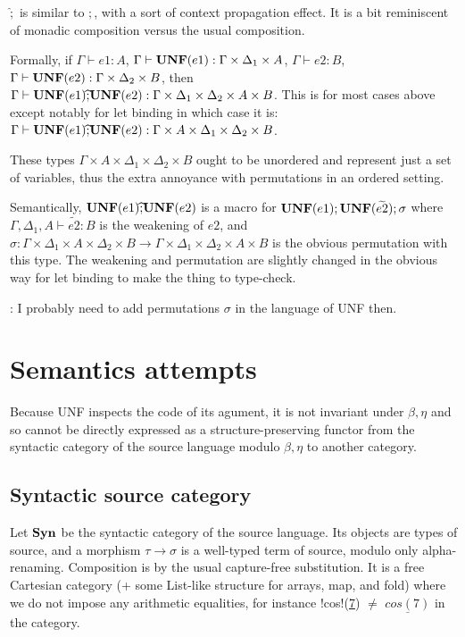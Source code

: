 $\widehat{;}$ is similar to $;$, with a sort of context propagation effect. 
It is a bit reminiscent of monadic composition versus the usual composition.

Formally, if $\Gamma\vdash e1: A$, $\Gamma\vdash \mathbf{UNF}(e1): \Gamma\times\Delta_1\times A$, $\Gamma\vdash e2: B$, $\Gamma\vdash \mathbf{UNF}(e2): \Gamma\times\Delta_2\times B$, then $\Gamma\vdash \mathbf{UNF}(e1) \widehat{;} \mathbf{UNF}(e2): \Gamma\times \Delta_1\times \Delta_2 \times A \times B$.
This is for most cases above except notably for let binding in which case it is: 
 $\Gamma\vdash \mathbf{UNF}(e1) \widehat{;} \mathbf{UNF}(e2): \Gamma\times A \times \Delta_1\times \Delta_2 \times B$. 

 These types $\Gamma\times A \times \Delta_1\times \Delta_2 \times B$ ought to be unordered and represent just a set of variables, thus the extra annoyance with permutations in an ordered setting. 

 Semantically, $\mathbf{UNF}(e1) \widehat{;} \mathbf{UNF}(e2)$ is a macro for $\mathbf{UNF}(e1) ; \mathbf{UNF}(\widetilde{e2}); \sigma$ where $\Gamma,\Delta_1,A\vdash \widetilde{e2}:B$ is the weakening of $e2$, and $\sigma: \Gamma\times\Delta_1\times A \times \Delta_2 \times B \to \Gamma\times\Delta_1\times \Delta_2 \times A\times B$ is the obvious permutation with this type.
The weakening and permutation are slightly changed in the obvious way for let binding to make the thing to type-check. 


 : I probably need to add permutations $\sigma$ in the language of UNF then.


\section{Semantics attempts}

Because UNF inspects the code of its agument, it is not invariant under $\beta,\eta$ and so cannot be directly expressed as a structure-preserving functor from the syntactic category of the source language modulo $\beta,\eta$ to another category. 

\subsection{Syntactic source category}

Let $\mathbf{Syn}$ be the syntactic category of the source language. Its objects are types of source, and a morphism $\tau \to \sigma$ is a well-typed term of source, modulo only alpha-renaming. Composition is by the usual capture-free substitution. It is a free Cartesian category (+ some List-like structure for arrays, map, and fold) where we do not impose any arithmetic equalities, for instance !cos!(\underline{7}) $\neq$ $\underline{cos(7)}$ in the category.


